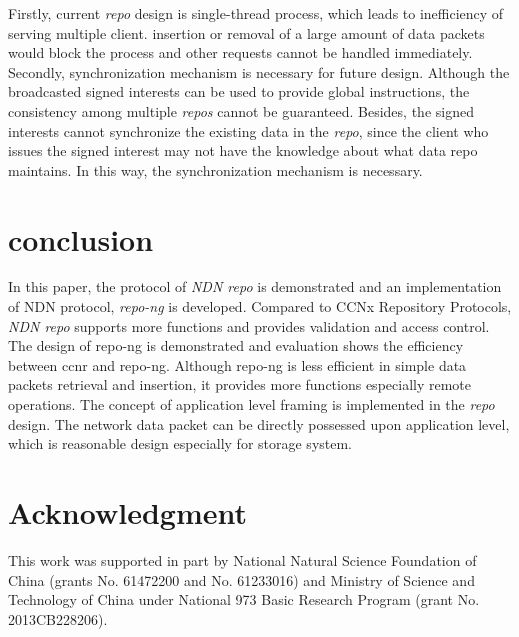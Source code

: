 \documentclass[conference]{IEEEtran}
\begin{document}
Firstly, current \emph{repo} design is single-thread process, which leads to inefficiency of serving multiple client. insertion or removal of a large amount of data packets would block the process and other requests cannot be handled immediately. Secondly, synchronization mechanism is necessary for future design. Although the broadcasted signed interests can be used to provide global instructions, the consistency among multiple \emph{repos} cannot be guaranteed. Besides, the signed interests cannot synchronize the existing data in the \emph{repo}, since the client who issues the signed interest may not have the knowledge about what data repo maintains. In this way, the synchronization mechanism is necessary.

\section{conclusion} \label{section-conclusion}
In this paper, the protocol of \emph{NDN repo} is demonstrated and an implementation of NDN protocol, \emph{repo-ng} is developed. Compared to CCNx Repository Protocols, \emph{NDN repo} supports more functions and provides validation and access control. The design of repo-ng is demonstrated and evaluation shows the efficiency between ccnr and repo-ng. Although repo-ng is less efficient in simple data packets retrieval and insertion, it provides more functions especially remote operations. The concept of application level framing is implemented in the \emph{repo} design. The network data packet can be directly possessed upon application level, which is reasonable design especially for storage system.

\section*{Acknowledgment}
This work was supported in part by National Natural Science Foundation of China (grants No. 61472200 and No. 61233016) and Ministry of Science and Technology of China under National 973 Basic Research Program (grant No. 2013CB228206).



\end{document}
